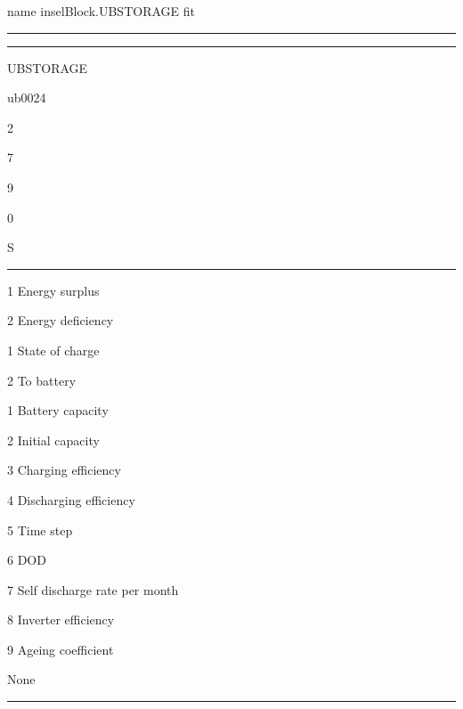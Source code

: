 \label{UBSTORAGE}\hypertarget{UBSTORAGE}{}
\pdfdest name {inselBlock.UBSTORAGE} fit


\bigskip

\hrule

\begin{center}

\end{center}

\medskip

\hrule

\begin{layoutlist}
\item[{\bf \mblue{Name}}]        UBSTORAGE
\item[{\bf \mblue{Function}}]    ub0024
\item[{\bf \mblue{Inputs}}]     2
\item[{\bf \mblue{Outputs}}]    7
\item[{\bf \mblue{Parameters}}] 9
\item[{\bf \mblue{Strings}}]    0
\item[{\bf \mblue{Group}}]      S
\end{layoutlist}

\medskip

\hrule

\bigskip

%
\begin{detaillist}
\item[1] Energy surplus
\item[2] Energy deficiency
\end{detaillist}

%
\begin{detaillist}
\item[1] State of charge
\item[2] To battery
\end{detaillist}

%
\begin{detaillist}
\item[1] Battery capacity
\item[2] Initial capacity
\item[3] Charging efficiency
\item[4] Discharging efficiency
\item[5] Time step
\item[6] DOD
\item[7] Self discharge rate per month
\item[8] Inverter efficiency
\item[9] Ageing coefficient
\end{detaillist}

%
\begin{detaillist}
\item[]  None
\end{detaillist}

\bigskip

\hrule
